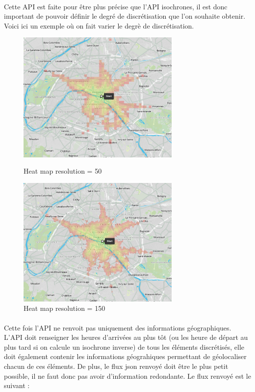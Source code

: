 \documentclass[a4paper]{report}
\begin{document}
\paragraph{} Cette API est faite pour être plus précise que l'API isochrones, il est donc important de pouvoir définir le degré de discrétisation que l'on souhaite obtenir. Voici ici un exemple où on fait varier le degrè de discrétisation.

\begin{figure}[H]
	\begin{minipage}[c]{.46\linewidth}
		\includegraphics[width=8cm]{image/heatmap_basse_reso}
       		\caption{Heat map resolution = 50}
		\label{Heat map resolution = 50}
	\end{minipage} \hfill
	\begin{minipage}[c]{.46\linewidth}
		\includegraphics[width=8cm]{image/heatmap_haute_reso}
       		\caption{Heat map resolution = 150}
		\label{Heat map resolution = 150}
	\end{minipage}
\end{figure}

\paragraph{}Cette fois l'API ne renvoit pas uniquement des informations géographiques. L'API doit renseigner les heures d'arrivées au plus tôt (ou les heure de départ au plus tard si on calcule un isochrone inverse) de tous les éléments discrétisés, elle doit également contenir les informations géograhiques permettant de géolocaliser chacun de ces éléments. De plus, le flux json renvoyé doit être le plus petit possible, il ne faut donc pas avoir d'information redondante. Le flux renvoyé est le suivant :
\end{document}

